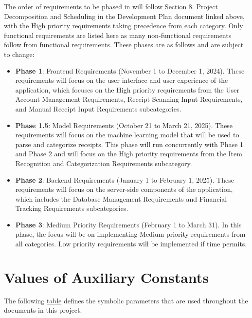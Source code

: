 \documentclass[12pt]{article}
\begin{document}
The order of requirements to be phased in will follow Section 8. Project Decomposition and Scheduling in the Development Plan document linked above, with the High priority requirements taking precedence from each category. Only functional requirements are listed here as many non-functional requirements follow from functional requirements. These phases are as follows and are subject to change:
\begin{itemize}
  \item \textbf{Phase 1}: Frontend Requirements (November 1 to December 1,
  2024). These requirements will focus on the user interface and user experience
  of the application, which focuses on the High priority requirements from the
  User Account Management Requirements, Receipt Scanning Input Requirements, and
  Manual Receipt Input Requirements subcategories.
  \item \textbf{Phase 1.5}: Model Requirements (October 21 to March 21, 2025).
  These requirements will focus on the machine learning model that will be used
  to parse and categorize receipts. This phase will run concurrently with Phase
  1 and Phase 2 and will focus on the High priority requirements from the Item
  Recognition and Categorization Requirements subcategory.
  \item \textbf{Phase 2}: Backend Requirements (January 1 to February 1, 2025).
  These requirements will focus on the server-side components of the
  application, which includes the Database Management Requirements and Financial
  Tracking Requirements subcategories.
  \item \textbf{Phase 3}: Medium Priority Requirements (February 1 to March 31).
  In this phase, the focus will be on implementing Medium priority requirements
  from all categories. Low priority requirements will be implemented if time
  permits.
\end{itemize}

\newpage

\section{Values of Auxiliary Constants}

The following \hyperref[Table:AuxConstants]{table} defines the symbolic
parameters that are used throughout the documents in this project.
\end{document}
